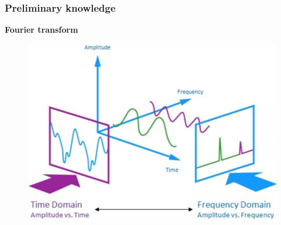 \documentclass[table]{beamer}
\begin{document}
\logo{}
\begin{frame}
\frametitle{Preliminary knowledge}
    {\large \textbf{Fourier transform}}
    \begin{figure}[H]
        \includegraphics[width=0.75\linewidth]{figures/fourier3.png}
    \end{figure}
\end{frame}
\end{document}
